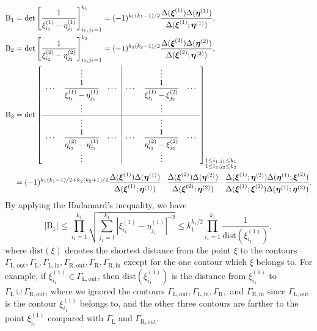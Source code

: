 \documentclass{article}
\numberwithin{equation}{section}
\newcommand{\dg}{\mathrm{dist}}
\newcommand{\inn}{\mathrm{in}}
\newcommand{\LL}{\mathrm{L}}
\newcommand{\out}{\mathrm{out}}
\newcommand{\RR}{\mathrm{R}}
\begin{document}
\begin{equation*}
	\begin{split}
		\mathrm{B}_1&= \det\left[\frac{1}{\xi^{(1)}_{i_1} -\eta^{(1)}_{j_1}}\right]_{i_1,j_1=1}^{k_1} = (-1)^{k_1(k_1-1)/2}\frac{ \Delta(\boldsymbol{\xi}^{(1)}) 
			\Delta(\boldsymbol{\eta}^{(1)}) 
		}
		{ \Delta(\boldsymbol{\xi}^{(1)}; \boldsymbol{\eta}^{(1)})},\\
		\mathrm{B}_2&= \det\left[\frac{1}{\xi^{(2)}_{i_2} -\eta^{(2)}_{j_2}}\right]_{i_2,j_2=1}^{k_2} = (-1)^{k_2(k_2-1)/2}\frac{ \Delta(\boldsymbol{\xi}^{(2)}) 
			\Delta(\boldsymbol{\eta}^{(2)}) 
		}
		{ \Delta(\boldsymbol{\xi}^{(2)}; \boldsymbol{\eta}^{(2)})},\\
		\mathrm{B}_3&
		= \det \left[
		\begin{array}{ccc|ccc}
			&\vdots&&&\vdots&\\
			\cdots&\displaystyle\frac{1}{\xi_{i_1}^{(1)} -\eta_{j_1}^{(1)}}&\cdots&\cdots&\displaystyle\frac{1}{\xi_{i_1}^{(1)} -\xi_{j_2}^{(2)}}&\cdots\\
			&\vdots&&&\vdots&\\
			\hline
			&\vdots&&&\vdots&\\
			\cdots&\displaystyle\frac{1}{\eta_{i_2}^{(2)} -\eta_{j_1}^{(1)}}&\cdots&\cdots&\displaystyle\frac{1}{\eta_{i_2}^{(2)} -\xi_{j_2}^{(2)}}&\cdots\\
			&\vdots&&&\vdots&
		\end{array}
		\right]_{\substack{1\le i_1,j_1\le k_1\\ 1\le i_2,j_2\le k_2}}\\
		&=(-1)^{k_1(k_1-1)/2+k_2(k_2+1)/2}
		\frac{ \Delta(\boldsymbol{\xi}^{(1)}) 
			\Delta(\boldsymbol{\eta}^{(1)}) 
		}
		{ \Delta(\boldsymbol{\xi}^{(1)}; \boldsymbol{\eta}^{(1)})}
		\cdot \frac{ \Delta(\boldsymbol{\xi}^{(2)}) 
			\Delta(\boldsymbol{\eta}^{(2)}) 
		}
		{ \Delta(\boldsymbol{\xi}^{(2)}; \boldsymbol{\eta}^{(2)})}
		\cdot 
		\frac{\Delta(\boldsymbol{\xi}^{(1)};\boldsymbol{\eta}^{(2)})
			\Delta(\boldsymbol{\eta}^{(1)};\boldsymbol{\xi}^{(2)})
		}
		{\Delta(\boldsymbol{\xi}^{(1)};\boldsymbol{\xi}^{(2)})
			\Delta(\boldsymbol{\eta}^{(1)};\boldsymbol{\eta}^{(2)})
		}.
	\end{split}
\end{equation*}
By applying the Hadamard's inequality, we have
\begin{equation*}
	\left|\mathrm{B}_1 \right| \le \prod_{i_1=1}^{k_1}\sqrt{\sum_{j_1=1}^{k_1}\left|\xi^{(1)}_{i_1} -\eta^{(1)}_{j_1}\right|^{-2}}
	\le k_1^{k_1/2}\prod_{i_1=1}^{k_1}\frac{1}{\dg(\xi_{i_1}^{(1)})},
\end{equation*}
where $\dg(\xi)$ denotes the shortest distance from the point $\xi$ to the contours $\Gamma_{\LL,\out},\Gamma_\LL,\Gamma_{\LL,\inn},\Gamma_{\RR,\out},\Gamma_\RR,\Gamma_{\RR,\inn}$ except for the one contour which $\xi$ belongs to. For example, if  $\xi_{i_1}^{(1)}\in\Gamma_{\LL,\out}$, then $\dg(\xi_{i_1}^{(1)})$ is the distance from $\xi_{i_1}^{(1)}$ to $\Gamma_\LL\cup\Gamma_{\RR,\out}$, where we ignored the contours $\Gamma_{\LL,\out},\Gamma_{\LL,\inn},\Gamma_\RR,$ and $\Gamma_{\RR,\inn}$ since $\Gamma_{\LL,\out}$ is the contour $\xi_{i_1}^{(1)}$ belongs to, and the other three contours are farther to the point $\xi_{i_1}^{(1)}$ compared with $\Gamma_\LL$ and $\Gamma_{\RR,\out}$.
\end{document}
